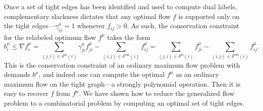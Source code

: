 \documentclass[11pt]{article}
\theoremstyle{definition}
\theoremstyle{definition}
\theoremstyle{definition}
\newcommand{\fu}{f^{\mu}}
\newcommand{\nfiu}{\nabla \fu_i}
\newcommand{\biu}{b_{i}^{\mu}}
\newcommand{\giij}{\gamma_{ij}^{\mu}}
\newcommand{\din}{\delta^{\text{in}}}
\newcommand{\dout}{\delta^{\text{out}}}
\begin{document}
	Once a set of tight edges has been identified and used to compute dual labels,
    complementary slackness dictates that any optimal flow $f$ is supported only on
    the tight edges---$\giij = 1$ 
    whenever $f_{ij} > 0$. As such, the conservation
    constraint for the relabeled optimum flow $f^\mu$ takes the form
    \[ \biu \leq \nfiu
    = \sum_{(j,i) \in \din(i)} \gamma_{ji}^{\mu} \fu_{ji} - \sum_{(i,j) \in \dout(i)} \fu_{ij}
    = \sum_{(j,i) \in \din(i)} \fu_{ji} - \sum_{(i,j) \in \dout(i)} \fu_{ij}. \]
    This is the conservation constraint of an ordinary maximum flow problem with demands
    $b^\mu$, and indeed one can compute the optimal $f^\mu$ as an
    ordinary maximum flow on the tight graph---a strongly polynomial operation.
    Then it is easy to recover $f$ from $f^\mu$. We have shown how to reduce the generalized
    flow problem to a combinatorial problem by computing an optimal set of tight edges.
    
\end{document}
